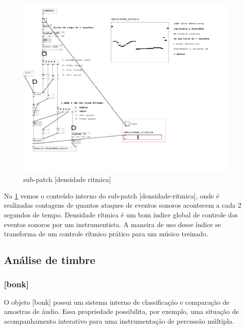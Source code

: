 \documentclass[draft]{ppgmus}
\begin{document}
\begin{figure}
\includegraphics[scale=.75]{prot5c}
\caption{sub-patch [densidade ritmica]}
\label{prot5c}
\end{figure}


Na \ref{prot5c} vemos o conteúdo interno do sub-patch [densidade-ritmica], onde é realizadas
contagens de quantos ataques de eventos sonoros acontecem a cada 2 segundos de tempo.
Densidade rítmica é um bom índice global de controle dos eventos sonoros por um instrumentista.
A maneira de uso desse índice se transforma de um controle rítmico prático para um
músico treinado.





\subsection{Análise de timbre}


\subsubsection{[bonk\texttildelow]}


O objeto [bonk\texttildelow] possui um sistema interno de classificação
e comparação de amostras de áudio. Essa propriedade possibilita, por exemplo, 
uma situação de acompanhamento interativo para uma instrumentação de 
percussão múltipla.
\end{document}
